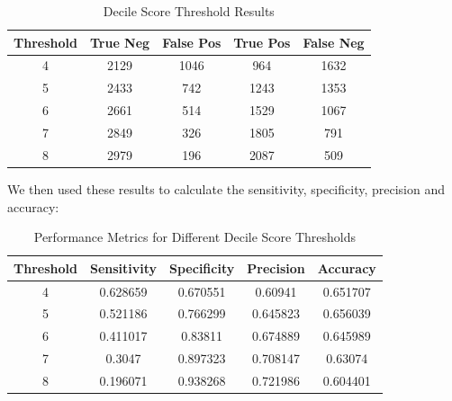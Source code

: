 \documentclass[conference]{IEEEtran}
\begin{document}
	\begin{table}[h!] \centering \begin{tabular}{|c|c|c|c|c|} \hline 
			\textbf{Threshold} & \textbf{True Neg} & \textbf{False Pos} & \textbf{True Pos} & \textbf{False Neg} \\ \hline 
			4                               & 2129                   & 1046                    & 964                    & 1632                    \\ \hline 5                               & 2433                   & 742                     & 1243                   & 1353                    \\ \hline 6                               & 2661                   & 514                     & 1529                   & 1067                    \\ \hline 7                               & 2849                   & 326                     & 1805                   & 791                     \\ \hline 8                               & 2979                   & 196                     & 2087                   & 509                     \\ \hline \end{tabular} \caption{Decile Score Threshold Results} \label{tab:decile_scores} \end{table}
	
	We then used these results to calculate the sensitivity, specificity, precision and accuracy:
	
	\begin{table}[h!]
		\centering
		\begin{tabular}{|c|c|c|c|c|}
			\hline
			\textbf{Threshold} & \textbf{Sensitivity} & \textbf{Specificity} & \textbf{Precision} & \textbf{Accuracy} \\ \hline
			4                               & 0.628659             & 0.670551             & 0.60941            & 0.651707          \\ \hline
			5                               & 0.521186             & 0.766299             & 0.645823           & 0.656039          \\ \hline
			6                               & 0.411017             & 0.83811              & 0.674889           & 0.645989          \\ \hline
			7                               & 0.3047               & 0.897323             & 0.708147           & 0.63074           \\ \hline
			8                               & 0.196071             & 0.938268             & 0.721986           & 0.604401          \\ \hline
		\end{tabular}
		\caption{Performance Metrics for Different Decile Score Thresholds}
		\label{tab:performance_metrics}
	\end{table}
	
\end{document}

